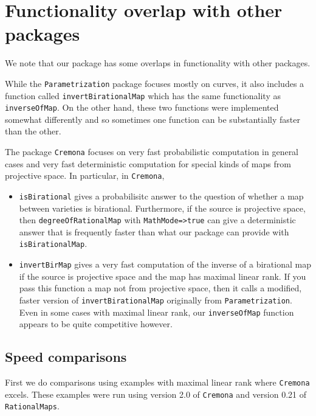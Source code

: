 \documentclass[11pt]{amsart}
\numberwithin{equation}{theorem}
\renewcommand{\:}{\colon}
\theoremstyle{theorem}
\begin{document}
{\color{black}\normalsize
\section{Functionality overlap with other packages}

We note that our package has some overlaps in functionality with other packages.

While the {\tt Parametrization} package \cite{ParametrizationPackage} focuses mostly on curves, it also includes a function called {\tt invertBirationalMap} which has the same functionality as {\tt inverseOfMap}. On the other hand, these two functions were implemented somewhat differently and so sometimes one function can be substantially faster than the other.

The package {\tt Cremona} \cite{CremonaPackage} focuses on very fast probabilistic computation in general cases and very fast deterministic computation for special kinds of maps from projective space. In particular, in {\tt Cremona},

\begin{itemize}
\item{}     {\tt isBirational} gives a probabilisitc answer to the question of whether a map between varieties is birational. Furthermore, if the source is projective space, then {\tt degreeOfRationalMap} with {\tt MathMode=>true} can give a deterministic answer that is frequently faster than what our package can provide with {\tt isBirationalMap}.
\item{}  {\tt invertBirMap} gives a very fast computation of the inverse of a birational map if the source is projective space and the map has maximal linear rank. If you pass this function a map not from projective space, then it calls a modified, faster version of {\tt invertBirationalMap} originally from {\tt Parametrization}. Even in some cases with maximal linear rank, our {\tt inverseOfMap} function appears to be quite competitive however.
\end{itemize}

\subsection{Speed comparisons}
\noindent
First we do comparisons using examples with maximal linear rank where {\tt Cremona} excels.  These examples were run using version 2.0 of {\tt Cremona} and version 0.21 of {\tt RationalMaps}.

}
\end{document}
